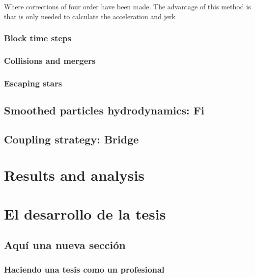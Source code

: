 Where corrections of four order have been made. The advantage of this method is that is only needed to calculate the acceleration and jerk





\subsection{Block time steps}
\subsection{Collisions and mergers}
\subsection{Escaping stars}

\section{Smoothed particles hydrodynamics: Fi}
\section{Coupling strategy: Bridge}

\chapter{Results and analysis}

\chapter{El desarrollo de la tesis}

\section{Aquí una nueva sección}

\subsection{Haciendo una tesis como un profesional}


